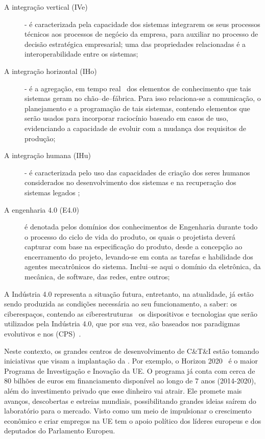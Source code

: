 \begin{description}
	\item[A integração vertical (IVe)] -	
	é caracterizada pela capacidade dos sistemas integrarem os seus processos técnicos aos processos de negócio da empresa, para auxiliar no processo de decisão estratégica empresarial; uma das propriedades relacionadas é a interoperabilidade entre os sistemas; 
	
	\item[A integração horizontal (IHo)] -
	é a agregação, em tempo real~\cite{VDE2014} dos elementos de conhecimento que tais sistemas geram no chão--de--fábrica. Para isso relaciona-se a comunicação, o planejamento e a programação de tais sistemas, contendo elementos que serão usados para incorporar raciocínio baseado em casos de uso, evidenciando a capacidade de evoluir com a mudança dos requisitos de produção; 
	
	\item[A integração humana (IHu)] -
	é caracterizada pelo uso das capacidades de criação dos seres humanos considerados no desenvolvimento dos sistemas e na recuperação dos sistemas legados \iTresZero;
	
	\item[A engenharia 4.0 (E4.0)]
	é denotada pelos domínios dos conhecimentos de Engenharia durante todo o processo do ciclo de vida do produto, os quais o projetista deverá capturar com base na especificação do produto, desde a concepção ao encerramento do projeto, levando-se em conta as tarefas e habilidade dos agentes mecatrônicos do sistema. Inclui--se aqui o domínio da eletrônica, da mecânica, de software, das redes, entre outros;
\end{description}
	
A Indústria 4.0 representa a situação futura, entretanto, na atualidade, já estão sendo produzida as condições necessária ao seu funcionamento, a saber: os ciberespaços, contendo as ciberestruturas~\cite{NITRDGROUPS2010} os dispositivos e tecnologias que serão utilizados pela Indústria 4.0, que por sua vez, são baseados nos paradigmas evolutivos e nos (CPS)~\cite{LEE2008}. 


Neste contexto, os grandes centros de desenvolvimento de C\&T\&I estão tomando iniciativas que visam a implantação da \iQuatroZero. Por exemplo, o Horizon 2020~\cite{H2020} é o maior Programa de Investigação e Inovação da UE. O programa já conta com cerca de 80 bilhões de euros em financiamento disponível ao longo de 7 anos (2014-2020), além do investimento privado que esse dinheiro vai atrair. Ele promete mais avanços, descobertas e estreias mundiais, possibilitando grandes ideias saírem do laboratório para o mercado. Visto como um meio de impulsionar o crescimento econômico e criar empregos na UE tem o apoio político dos líderes europeus e dos deputados do Parlamento Europeu. 
	
